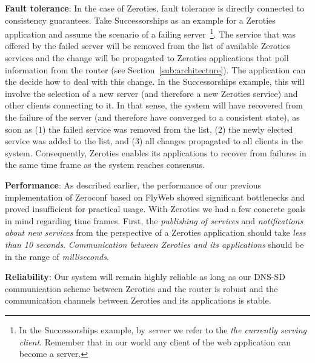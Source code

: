 \textbf{Fault tolerance}:
In the case of Zeroties, fault tolerance is directly connected to consistency guarantees.
Take Successorships as an example for a Zeroties application and assume the scenario of a failing server~\footnote{In the Successorships example, by \textit{server} we refer to the \textit{the currently serving client}. Remember that in our world any client of the web application can become a server.}.
The service that was offered by the failed server will be removed from the list of available Zeroties services and the change will be propagated to Zeroties applications that poll information from the router (see Section~\ref{sub:architecture}).
The application can the decide how to deal with this change.
In the Successorships example, this will involve the selection of a new server (and therefore a new Zeroties service) and other clients connecting to it.
In that sense, the system will have recovered from the failure of the server (and therefore have converged to a consistent state), as soon as (1) the failed service was removed from the list, (2) the newly elected service was added to the list, and (3) all changes propagated to all clients in the system.
Consequently, Zeroties enables its applications to recover from failures in the same time frame as the system reaches consensus.

\textbf{Performance}:
As described earlier, the performance of our previous implementation of Zeroconf based on FlyWeb showed significant bottlenecks and proved insufficient for practical usage.
With Zeroties we had a few concrete goals in mind regarding time frames. 
First, the \textit{publishing of services} and \textit{notifications about new services} from the perspective of a Zeroties application should take \textit{less than 10 seconds}.
\textit{Communication between Zeroties and its applications} should be in the range of \textit{milliseconds}.

\textbf{Reliability}:
Our system will remain highly reliable as long as our DNS-SD communication scheme between Zeroties and the router is robust and the communication channels between Zeroties and its applications is stable.

